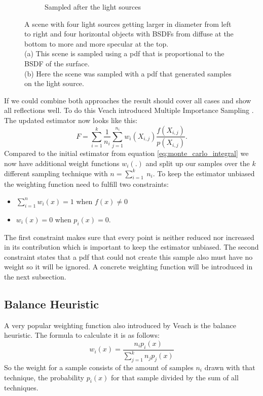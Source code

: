 \begin{figure}
\begin{subfigure}[b]{0.45\textwidth}
        \caption{Sampled after the light sources}
        \label{fig:veach_mis_light}
    \end{subfigure}
    \caption{A scene with four light sources getting larger in diameter from left to right
    and four horizontal objects with BSDFs from diffuse at the bottom to more and more specular at the top.\\
    (a) This scene is sampled using a pdf that is proportional to the BSDF of the surface.\\
    (b) Here the scene was sampled with a pdf that generated samples on the light source.
    \cite[Figure~9.2]{veach-thesis}}
    \label{fig:veach_mis_single}
\end{figure}

If we could combine both approaches the result should cover all cases and show all reflections well.
To do this Veach introduced Multiple Importance Sampling \cite[Chapter~9]{veach-thesis}.
The updated estimator now looks like this: $$ F = \sum_{i = 1}^k \frac{1}{n_i} \sum_{j = 1}^{n_i} w_i(X_{i,j}) \frac{f(X_{i,j})}{p(X_{i,j})}. $$
Compared to the initial estimator from equation \ref{eq:monte_carlo_integral} we now have additional weight functions $ w_i(.) $
and split up our samples over the $ k $ different sampling technique with $ n = \sum_{i = 1}^k~n_i $.
To keep the estimator unbiased the weighting function need to fulfill two constraints:
\begin{itemize}
    \item $ \sum_{i = 1}^n w_i(x) = 1 $ when $ f(x) \neq 0 $
    \item $ w_i(x) = 0 $ when $ p_i(x) = 0 $.
\end{itemize}
The first constraint makes sure that every point is neither reduced nor increased in its contribution
which is important to keep the estimator unbiased.
The second constraint states that a pdf that could not create this sample also must have no weight
so it will be ignored.
A concrete weighting function will be introduced in the next subsection.


\subsection{Balance Heuristic}
\label{sec:balance_heuristic}
A very popular weighting function also introduced by Veach \cite[Chapter~9.2.2]{veach-thesis} is the balance heuristic.
The formula to calculate it is as follows: $$ w_i(x) = \frac{n_i p_i(x)}{\sum_{j = 1}^k n_j p_j(x)} $$
So the weight for a sample consists of the amount of samples $ n_i $ drawn with that technique,
the probability $ p_i(x) $ for that sample divided by the sum of all techniques.

